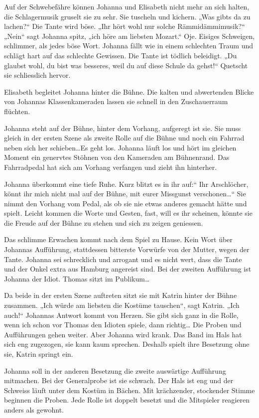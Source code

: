 \documentclass[10pt,titlepage,a5paper]{book}
\begin{document}
Auf der Schwebefähre können Johanna und Elisabeth nicht mehr an sich halten, die Schlagermusik gruselt sie zu sehr. Sie tuscheln und kichern. 
„Was gibts da zu lachen?“ Die Tante wird böse. „Ihr hört wohl nur solche Rämmidämmimusik?“ „Nein“ sagt Johanna spitz, „ich höre am liebsten Mozart.“ Oje. Eisiges Schweigen, schlimmer, als jedes böse Wort. Johanna fällt wie in einem schlechten Traum und schlägt hart auf das schlechte Gewissen. Die Tante ist tödlich beleidigt. „Du glaubst wohl, du bist was besseres, weil du auf diese Schule da gehst!“ Quetscht sie schliesslich hervor. 

Elisabeth begleitet Johanna hinter die Bühne. Die kalten und abwertenden Blicke von Johannas Klassenkameraden lassen sie schnell in den Zuschauerraum flüchten. 

Johanna steht auf der Bühne, hinter dem Vorhang, aufgeregt ist sie. Sie muss gleich in der ersten Szene als zweite Rolle auf die Bühne und noch ein Fahrrad neben sich her schieben\dots  Es geht los. Johanna läuft los und hört im gleichen Moment ein genervtes Stöhnen von den Kameraden am Bühnenrand. Das Fahrradpedal hat sich am Vorhang verfangen und zieht ihn hinterher. 

Johanna  überkommt eine tiefe Ruhe. Kurz blitzt es in ihr auf:“ Ihr Arschlöcher, könnt ihr mich nicht mal auf der Bühne, mit eurer Missgunst verschonen\dots “ Sie nimmt den Vorhang vom Pedal, als  ob sie nie etwas anderes gemacht hätte und spielt. Leicht kommen die Worte und Gesten, fast, will es ihr scheinen, könnte sie die Freude auf der Bühne zu stehen und sich zu zeigen geniessen.

Das schlimme Erwachen kommt nach dem Spiel zu Hause. Kein Wort über Johannas Aufführung, stattdessen bitterste Vorwürfe von der Mutter, wegen der Tante. Johanna sei schrecklich und arrogant und es nicht wert, dass die Tante und der Onkel extra aus Hamburg angereist sind. 
Bei der zweiten Aufführung ist Johanna der Idiot. Thomas sitzt im Publikum\dots 

Da beide in der ersten Szene auftreten sitzt sie mit Katrin hinter der Bühne zusammen. „Ich würde am liebsten die Kostüme tauschen“, sagt Katrin. „Ich auch!“ Johannas Antwort kommt von Herzen. Sie gibt sich ganz in die Rolle, wenn ich schon vor Thomas den Idioten spiele, dann richtig\dots 
Die Proben und Aufführungen gehen weiter. Aber Johanna wird krank. Das Band im Hals hat sich eng zugezogen, sie kann kaum sprechen. Deshalb spielt ihre Besetzung ohne sie, Katrin springt ein.

Johanna soll in der anderen Besetzung die zweite auswärtige Aufführung mitmachen. Bei der Generalprobe ist sie schwach. Der Hals ist eng und der Schweiss läuft unter dem Kostüm in Bächen. Mit krächzender, stockender Stimme beginnen die Proben. Jede Rolle ist doppelt besetzt und die Mitspieler reagieren anders als gewohnt.
\end{document}
